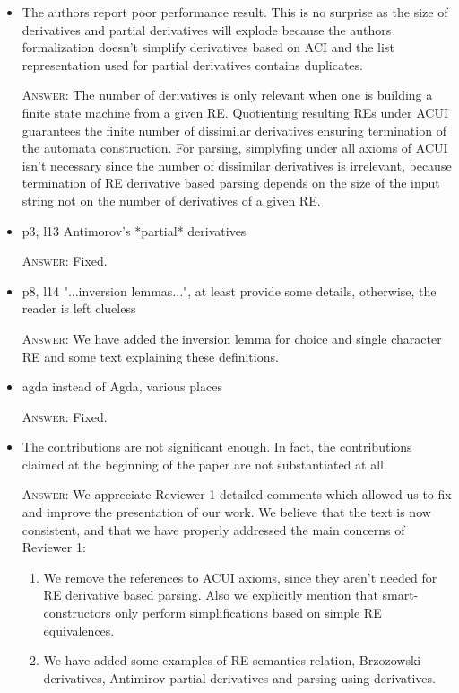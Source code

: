 \documentclass{article}
\begin{document}
\begin{itemize}
        
    \item The authors report poor performance result. This is no surprise as the size of derivatives and partial derivatives
          will explode because the authors formalization doesn't simplify derivatives based on ACI
          and the list representation used for partial derivatives contains duplicates.
    
    \textsc{Answer}: The number of derivatives is only relevant when one is building a finite state machine from a given RE.
    Quotienting resulting REs under ACUI guarantees the finite number of dissimilar derivatives ensuring termination
    of the automata construction. For parsing, simplyfing under all axioms of ACUI isn't necessary since the number
    of dissimilar derivatives is irrelevant, because termination of RE derivative based parsing depends on the 
    size of the input string not on the number of derivatives of a given RE.      

    \item p3, l13     Antimorov's *partial* derivatives
    
    \textsc{Answer}: Fixed.
    
    \item p8, l14    "...inversion lemmas...", at least provide some details, otherwise, the reader is left clueless
    
    \textsc{Answer:} We have added the inversion lemma for choice and single character RE and some text explaining these definitions.
    
    \item agda instead of Agda, various places
 
    \textsc{Answer}: Fixed. 
    
    \item The contributions are not significant enough. In fact, the contributions claimed
          at the beginning of the paper are not substantiated at all.
          
    \textsc{Answer}: We appreciate Reviewer 1 detailed comments which allowed us to fix and improve the presentation of our work. 
     We believe that the text is now consistent, and that we have properly addressed the main concerns of Reviewer 1:
     \begin{enumerate}
         \item We remove the references to ACUI axioms, since they aren't needed for RE derivative based parsing. Also 
               we explicitly mention that smart-constructors only perform simplifications based on simple RE equivalences.
         \item We have added some examples of RE semantics relation, Brzozowski derivatives, Antimirov partial derivatives 
               and parsing using derivatives. 
     \end{enumerate}
     

\end{itemize}
\end{document}
